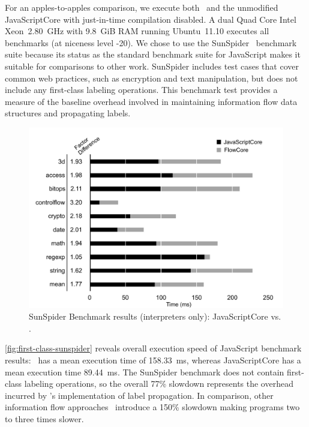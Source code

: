 For an apples-to-apples comparison, we execute both \JitFlow\ and the unmodified JavaScriptCore with just-in-time compilation disabled.
A dual Quad Core Intel Xeon~2.80~GHz with 9.8~GiB RAM running Ubuntu~11.10 executes all benchmarks (at niceness level -20).
We chose to use the SunSpider~\cite{sunspider} benchmark suite because its status as the standard benchmark suite for JavaScript makes it suitable for comparisons to other work.
SunSpider includes test cases that cover common web practices, such as encryption and text manipulation, but does not include any first-class labeling operations.
This benchmark test provides a measure of the baseline overhead involved in maintaining information flow data structures and propagating labels.

\begin{figure}[ht]
  \centering
  \includegraphics[width=\textwidth,keepaspectratio=true]{graphics/sunspider-jsc-vs-flowcore.pdf}
  \caption{SunSpider Benchmark results (interpreters only): JavaScriptCore vs. \JitFlow.}
  \label{fig:first-class-sunspider}
\end{figure}

\autoref{fig:first-class-sunspider} reveals overall execution speed of JavaScript benchmark results: \JitFlow\ has a mean execution time of 158.33~ms, whereas JavaScriptCore has a mean execution time 89.44~ms.
The SunSpider benchmark does not contain first-class labeling operations, so the overall 77\% slowdown represents the overhead incurred by \JitFlow's implementation of label propagation.
In comparison, other information flow approaches~\cite{just.etal+11} introduce a 150\% slowdown making programs two to three times slower.

